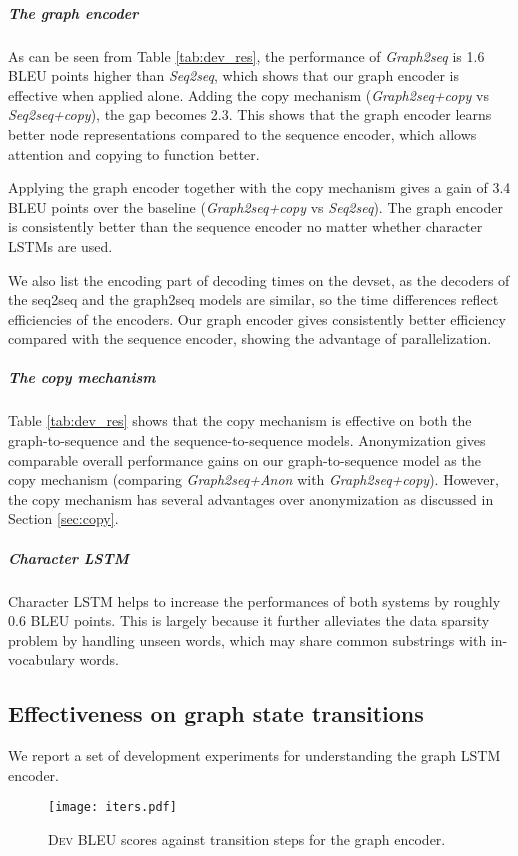 \documentclass[11pt,a4paper]{article}
\begin{document}
\subparagraph{The graph encoder}
As can be seen from Table \ref{tab:dev_res}, the performance of \emph{Graph2seq} is 1.6 BLEU points higher than \emph{Seq2seq}, which shows that our graph encoder is effective when applied alone.
Adding the copy mechanism (\emph{Graph2seq+copy} vs \emph{Seq2seq+copy}), the gap becomes 2.3.
This shows that the graph encoder learns better node representations compared to the sequence encoder, which allows attention and copying to
function better.


Applying the graph encoder together with the copy mechanism gives a gain of 3.4 BLEU points over the baseline (\emph{Graph2seq+copy} vs \emph{Seq2seq}).
The graph encoder is consistently better than the sequence encoder no matter whether character LSTMs are used. 


We also list the encoding part of decoding times on the devset, 
as the decoders of the seq2seq and the graph2seq models are similar,
so the time differences reflect efficiencies of the encoders.
Our graph encoder gives consistently better efficiency compared with the sequence encoder, showing the advantage of parallelization.


\subparagraph{The copy mechanism}
Table \ref{tab:dev_res} shows that the copy mechanism is effective on both the graph-to-sequence and the sequence-to-sequence models.
Anonymization gives comparable overall performance gains on our graph-to-sequence model as the copy mechanism (comparing \emph{Graph2seq+Anon} with \emph{Graph2seq+copy}).
However, the copy mechanism has several advantages over anonymization as discussed in Section \ref{sec:copy}.


\subparagraph{Character LSTM}
Character LSTM helps to increase the performances of both systems by roughly 0.6 BLEU points.
This is largely because it further alleviates the data sparsity problem by handling unseen words, which may share common substrings with in-vocabulary words.


\subsection{Effectiveness on graph state transitions}


We report a set of development experiments for understanding the graph LSTM encoder.


\begin{figure}[t]
\centering
\texttt{[image: iters.pdf]}
\vspace{-1.0em}
\caption{\textsc{Dev} BLEU scores against transition steps for the graph encoder.}
\label{fig:iters}
\end{figure}
\end{document}
